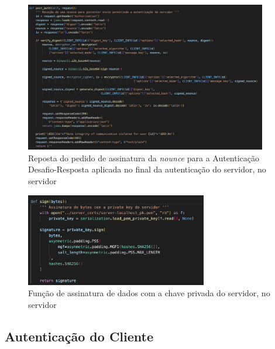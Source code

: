 \documentclass[10pt,english]{article}
\begin{document}
\begin{figure}[!h]
        \centering
        \includegraphics[width=400]{images/post_auth_server.png}
        \caption{Reposta do pedido de assinatura da \textit{nounce} para a Autenticação Desafio-Resposta aplicada no final da autenticação do servidor, no servidor}
\end{figure}

\begin{figure}[!h]
        \centering
        \includegraphics[width=300]{images/sign_server.png}
        \caption{Função de assinatura de dados com a chave privada do servidor, no servidor}
\end{figure}

\clearpage

\subsection{Autenticação do Cliente}
\end{document}
